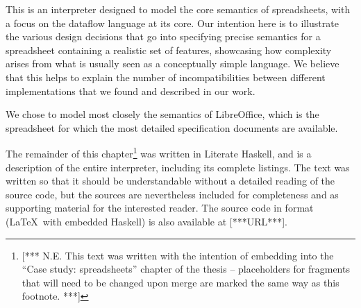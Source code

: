 \newcommand{\framedhslinecorrect}[2]%
  {#1[#2]}

\newcommand{\framedhs}{\sethscode{framedhscode}}


\newenvironment{inlinehscode}%
  {\(\def\column##1##2{}%
   \let\>\undefined\let\<\undefined\let\\\undefined
   \newcommand\>[1][]{}\newcommand\<[1][]{}\newcommand\\[1][]{}%
   \def\fromto##1##2##3{##3}%
   \def\nextline{}}{\) }%

\newcommand{\inlinehs}{\sethscode{inlinehscode}}


\newenvironment{joincode}%
  {\let\orighscode=\hscode
   \let\origendhscode=\endhscode
   \def\endhscode{\def\hscode{\endgroup\def\@currenvir{hscode}\\}\begingroup}
   \orighscode\def\hscode{\endgroup\def\@currenvir{hscode}}}%
  {\origendhscode
   \global\let\hscode=\orighscode
   \global\let\endhscode=\origendhscode}%

\makeatother
\EndFmtInput
%






This is an interpreter designed to model the core semantics of spreadsheets,
with a focus on the dataflow language at its core. Our intention here is to
illustrate the various design decisions that go into specifying precise
semantics for a spreadsheet containing a realistic set of features, showcasing
how complexity arises from what is usually seen as a conceptually simple
language. We believe that this helps to explain the number of
incompatibilities between different implementations that we found and
described in our work.

We chose to model most closely the semantics of LibreOffice, which is the
spreadsheet for which the most detailed specification documents are available.

The remainder of this chapter\footnote{[*** N.E. This text was written with
the intention of embedding into the ``Case study: spreadsheets'' chapter of the
thesis -- placeholders for fragments that will need to be changed upon merge
are marked the same way as this footnote. ***]} was written in Literate
Haskell, and is a description of the entire interpreter, including its
complete listings. The text was written so that it should be understandable
without a detailed reading of the source code, but the sources are
nevertheless included for completeness and as supporting material for the
interested reader. The source code in  format (\LaTeX~with embedded
Haskell) is also available at [***URL***].


